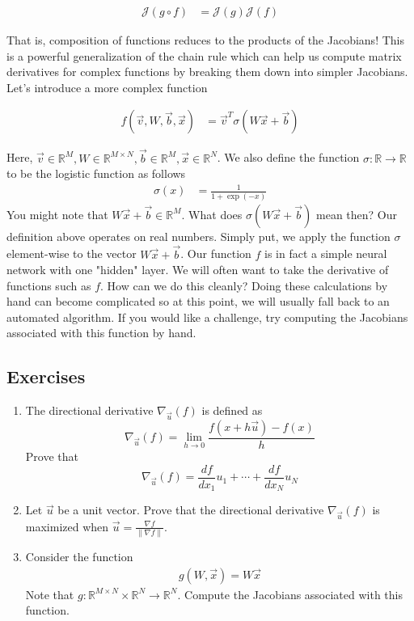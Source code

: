 \documentclass[book.tex]{subfiles}
\begin{document}
\begin{align}
    \mathcal{J}(g \circ f) &= \mathcal{J}(g) \mathcal{J}(f)
\end{align}

That is, composition of functions reduces to the products of the Jacobians! This is a powerful generalization of the chain rule which can help us compute matrix derivatives for complex functions by breaking them down into simpler Jacobians. Let's introduce a more complex function

\begin{align}
f(\vec{v}, W, \vec{b}, \vec{x}) &= \vec{v}^T \sigma\left (W \vec{x} + \vec{b} \right )
\end{align}

Here, $\vec{v} \in \mathbb{R}^M, W \in \mathbb{R}^{M \times N}, \vec{b} \in \mathbb{R}^M, \vec{x} \in \mathbb{R}^N$. We also define the function $\sigma: \mathbb{R} \to \mathbb{R}$ to be the logistic function as follows
\begin{align}
    \sigma(x) &= \frac{1}{1 + \exp(-x)}
\end{align}
You might note that $W \vec{x} + \vec{b} \in \mathbb{R}^M$. What does $\sigma(W \vec{x} + \vec{b})$ mean then? Our definition above operates on real numbers. Simply put, we apply the function $\sigma$ element-wise to the vector $W \vec{x} + \vec{b}$. Our function $f$ is in fact a simple neural network with one "hidden" layer. We will often want to take the derivative of functions such as $f$. How can we do this cleanly? Doing these calculations by hand can become complicated so at this point, we will usually fall back to an automated algorithm. If you would like a challenge, try computing the Jacobians associated with this function by hand. %





\subsection{Exercises}

\begin{enumerate}
    \item The directional derivative $\nabla_{\vec{u}}(f)$ is defined as
    \[ \nabla_{\vec{u}}(f) = \lim_{h \to 0} \frac{f(x + h\vec{u}) - f(x)}{h} \]
    Prove that 
    \[ \nabla_{\vec{u}}(f) = \frac{df}{dx_1}u_1 + \cdots + \frac{df}{dx_N} u_N \]
    \item Let $\vec{u}$ be a unit vector. Prove that the directional derivative $\nabla_{\vec{u}}(f)$ is maximized when $\vec{u} = \frac{\nabla f}{\|\nabla f\|}$.
    \item Consider the function
\begin{align}
    g(W, \vec{x}) = W \vec{x}
\end{align}
Note that $g: \mathbb{R}^{M \times N} \times \mathbb{R}^N \to \mathbb{R}^N$. Compute the Jacobians associated with this function.
\end{enumerate}
\end{document}
